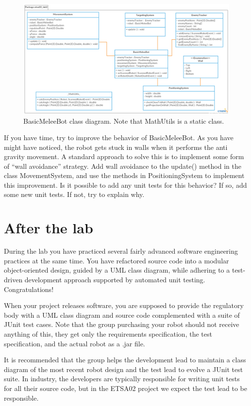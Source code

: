 \documentclass{scrreprt}
\begin{document}
\begin{figure}
\centering
\includegraphics[width=1.1\textwidth]{figures/BasicMeleeBotClassDiagram.png}
\caption{BasicMeleeBot class diagram. Note that MathUtils is a static class.}
\label{fig:classDiagram}
\end{figure}

If you have time, try to improve the behavior of BasicMeleeBot. As you have might have noticed, the robot gets stuck in walls when it performs the anti gravity movement. A standard approach to solve this is to implement some form of ``wall avoidance'' strategy. Add wall avoidance to the update() method in the class MovementSystem, and use the methods in PositioningSystem to implement this improvement. Is it possible to add any unit tests for this behavior? If so, add some new unit tests. If not, try to explain why.

\chapter{After the lab}
During the lab you have practiced several fairly advanced software engineering practices at the same time. You have refactored source code into a modular object-oriented design, guided by a UML class diagram, while adhering to a test-driven development approach supported by automated unit testing. Congratulations!

When your project releases software, you are supposed to provide the regulatory body with a UML class diagram and source code complemented with a suite of JUnit test cases. Note that the group purchasing your robot should not receive anything of this, they get only the requirements specification, the test specification, and the actual robot as a .jar file.

It is recommended that the group helps the development lead to maintain a class diagram of the most recent robot design and the test lead to evolve a JUnit test suite. In industry, the developers are typically responsible for writing unit tests for all their source code, but in the ETSA02 project we expect the test lead to be responsible. 
\end{document}
